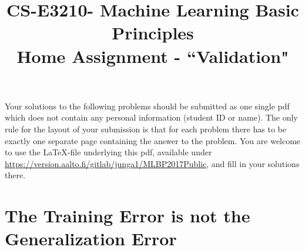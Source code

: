 \documentclass[article,11pt]{article}
\title{CS-E3210- Machine Learning Basic Principles \\
	Home Assignment - ``Validation"}
\begin{document}
\date{}
\maketitle

Your solutions to the following problems should be submitted as one single pdf which does not contain 
any personal information (student ID or name).  The only rule for the layout of your submission is that for each 
problem there has to be exactly one separate page containing the answer to the problem. You are welcome to use the \LaTeX-file underlying this pdf, 
available under \url{https://version.aalto.fi/gitlab/junga1/MLBP2017Public}, and fill in your solutions there. 




\newpage

\section{The Training Error is not the Generalization Error}
\end{document}
